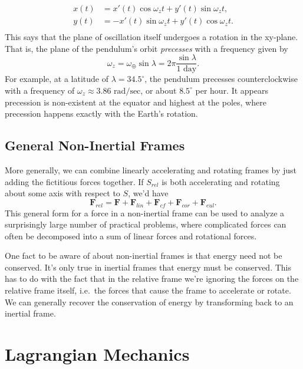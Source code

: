 \documentclass[
  letterpaper,
  DIV=11,
  numbers=noendperiod]{scrreprt}
\begin{document}
\[
\begin{align*}
x(t) &= x'(t) \cos\omega_z t + y'(t) \sin\omega_z t, \\
y(t) &= -x'(t) \sin\omega_z t + y'(t) \cos\omega_z t. \\
\end{align*}
\] This says that the plane of oscillation itself undergoes a rotation
in the xy-plane. That is, the plane of the pendulum's orbit
\emph{precesses} with a frequency given by \[
\omega_z = \omega_{\oplus} \sin\lambda = 2\pi\frac{\sin\lambda}{\text{1 day}}.
\] For example, at a latitude of \(\lambda = 34.5^\circ\), the pendulum
precesses counterclockwise with a frequency of
\(\omega_z \approx \text{3.86 rad/sec}\), or about \(8.5^\circ\) per
hour. It appears precession is non-existent at the equator and highest
at the poles, where precession happens exactly with the Earth's
rotation.

\hypertarget{general-non-inertial-frames}{%
\section{General Non-Inertial
Frames}\label{general-non-inertial-frames}}

More generally, we can combine linearly accelerating and rotating frames
by just adding the fictitious forces together. If \(S_{rel}\) is both
accelerating and rotating about some axis with respect to \(S\), we'd
have \[
\mathbf{F}_{rel} = \mathbf{F} + \mathbf{F}_{lin} + \mathbf{F}_{cf} + \mathbf{F}_{cor} + \mathbf{F}_{eul}.
\] This general form for a force in a non-inertial frame can be used to
analyze a surprisingly large number of practical problems, where
complicated forces can often be decomposed into a sum of linear forces
and rotational forces.

One fact to be aware of about non-inertial frames is that energy need
not be conserved. It's only true in inertial frames that energy must be
conserved. This has to do with the fact that in the relative frame we're
ignoring the forces on the relative frame itself, i.e.~the forces that
cause the frame to accelerate or rotate. We can generally recover the
conservation of energy by transforming back to an inertial frame.

\hypertarget{lagrangian-mechanics}{%
\chapter{Lagrangian Mechanics}\label{lagrangian-mechanics}}
\end{document}
